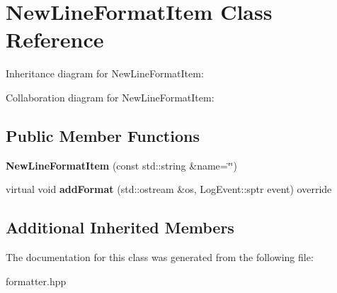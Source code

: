 \hypertarget{classNewLineFormatItem}{}\section{New\+Line\+Format\+Item Class Reference}
\label{classNewLineFormatItem}


Inheritance diagram for New\+Line\+Format\+Item\+:


Collaboration diagram for New\+Line\+Format\+Item\+:
\subsection*{Public Member Functions}
\begin{DoxyCompactItemize}
\item 
\mbox{\label{classNewLineFormatItem_acc40847c003e72e75c8d6b88160ea384}} 
{\bfseries New\+Line\+Format\+Item} (const std\+::string \&name=\char`\"{}\char`\"{})
\item 
\mbox{\label{classNewLineFormatItem_a46e3d88e566379cd96426377ac889c22}} 
virtual void {\bfseries add\+Format} (std\+::ostream \&os, Log\+Event\+::sptr event) override
\end{DoxyCompactItemize}
\subsection*{Additional Inherited Members}


The documentation for this class was generated from the following file\+:\begin{DoxyCompactItemize}
\item 
formatter.\+hpp\end{DoxyCompactItemize}

